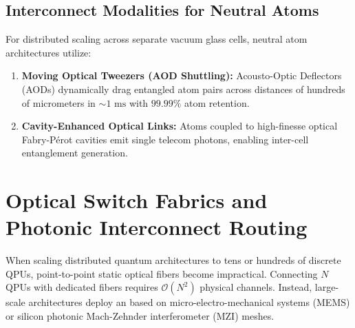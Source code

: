 \subsection{Interconnect Modalities for Neutral Atoms}
For distributed scaling across separate vacuum glass cells, neutral atom architectures utilize:
\begin{enumerate}
    \item \textbf{Moving Optical Tweezers (AOD Shuttling):} Acousto-Optic Deflectors (AODs) dynamically drag entangled atom pairs across distances of hundreds of micrometers in $\sim 1\text{ ms}$ with $99.99\%$ atom retention.
    \item \textbf{Cavity-Enhanced Optical Links:} Atoms coupled to high-finesse optical Fabry-Pérot cavities emit single telecom photons, enabling inter-cell entanglement generation.
\end{enumerate}


\section{Optical Switch Fabrics and Photonic Interconnect Routing}
\label{sec:optical_switch_fabrics}

When scaling distributed quantum architectures to tens or hundreds of discrete QPUs, point-to-point static optical fibers become impractical. Connecting $N$ QPUs with dedicated fibers requires $\mathcal{O}(N^2)$ physical channels. Instead, large-scale architectures deploy an  based on micro-electro-mechanical systems (MEMS) or silicon photonic Mach-Zehnder interferometer (MZI) meshes.

